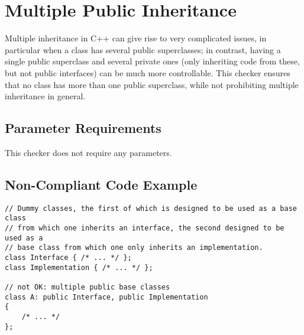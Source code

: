 %
%

\section{Multiple Public Inheritance}
\label{MultiplePublicInheritance::overview}

Multiple inheritance in C++ can give rise to very complicated issues, in
particular when a class has several public superclasses; in contrast, having a
single public superclass and several private ones (only inheriting code from
these, but not public interfaces) can be much more controllable. This checker
ensures that no class has more than one public superclass, while not
prohibiting multiple inheritance in general.

\subsection{Parameter Requirements}

This checker does not require any parameters.

\subsection{Non-Compliant Code Example}

\begin{verbatim}
// Dummy classes, the first of which is designed to be used as a base class
// from which one inherits an interface, the second designed to be used as a
// base class from which one only inherits an implementation.
class Interface { /* ... */ };
class Implementation { /* ... */ };

// not OK: multiple public base classes
class A: public Interface, public Implementation
{
    /* ... */
};
\end{verbatim}

